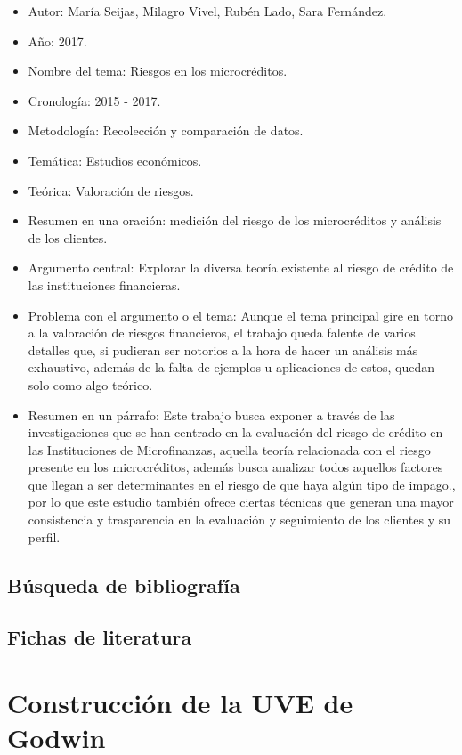 \documentclass[
  letterpaper,
  DIV=11,
  numbers=noendperiod]{scrreprt}
\begin{document}
\begin{itemize}
\item
  Autor: María Seijas, Milagro Vivel, Rubén Lado, Sara Fernández.
\item
  Año: 2017.
\item
  Nombre del tema: Riesgos en los microcréditos.
\item
  Cronología: 2015 - 2017.
\item
  Metodología: Recolección y comparación de datos.
\item
  Temática: Estudios económicos.
\item
  Teórica: Valoración de riesgos.
\item
  Resumen en una oración: medición del riesgo de los microcréditos y
  análisis de los clientes.
\item
  Argumento central: Explorar la diversa teoría existente al riesgo de
  crédito de las instituciones financieras.
\item
  Problema con el argumento o el tema: Aunque el tema principal gire en
  torno a la valoración de riesgos financieros, el trabajo queda falente
  de varios detalles que, si pudieran ser notorios a la hora de hacer un
  análisis más exhaustivo, además de la falta de ejemplos u aplicaciones
  de estos, quedan solo como algo teórico.
\item
  Resumen en un párrafo: Este trabajo busca exponer a través de las
  investigaciones que se han centrado en la evaluación del riesgo de
  crédito en las Instituciones de Microfinanzas, aquella teoría
  relacionada con el riesgo presente en los microcréditos, además busca
  analizar todos aquellos factores que llegan a ser determinantes en el
  riesgo de que haya algún tipo de impago., por lo que este estudio
  también ofrece ciertas técnicas que generan una mayor consistencia y
  trasparencia en la evaluación y seguimiento de los clientes y su
  perfil.
\end{itemize}

\subsection{Búsqueda de
bibliografía}\label{buxfasqueda-de-bibliografuxeda}

\subsection{Fichas de literatura}\label{fichas-de-literatura}

\section{Construcción de la UVE de
Godwin}\label{construcciuxf3n-de-la-uve-de-godwin}
\end{document}
